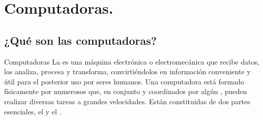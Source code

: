 \section{Computadoras.}
\subsection{¿Qué son las computadoras?}


\begin{frame}{Computadoras}
	La  es una máquina electrónica o electromecánica que recibe
	datos, los analiza, procesa y transforma, convirtiéndolos en información
	conveniente y útil para el posterior uso por seres humanos.
  \jump
	Una computadora está formado físicamente por numerosos  que, en conjunto y coordinados por algún
  , pueden realizar diversas tareas a grandes velocidades.
	\jump
	Están constituidas de dos partes esenciales, el 
	y el .
\end{frame}



